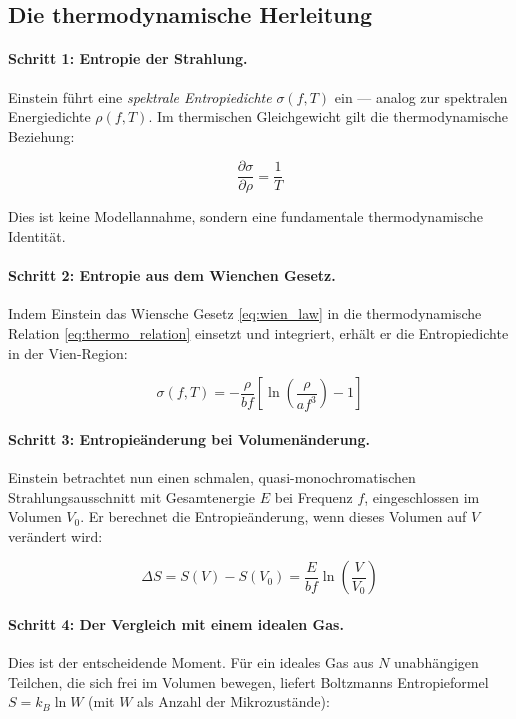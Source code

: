 \subsection{Die thermodynamische Herleitung}

\paragraph{Schritt 1: Entropie der Strahlung.}
Einstein führt eine \emph{spektrale Entropiedichte} $\sigma(f, T)$ ein — analog zur 
spektralen Energiedichte $\rho(f, T)$. Im thermischen Gleichgewicht gilt die 
thermodynamische Beziehung:

\begin{equation}
    \frac{\partial \sigma}{\partial \rho} = \frac{1}{T}
    \label{eq:thermo_relation}
\end{equation}

Dies ist keine Modellannahme, sondern eine fundamentale thermodynamische Identität.

\paragraph{Schritt 2: Entropie aus dem Wienchen Gesetz.}
Indem Einstein das Wiensche Gesetz \eqref{eq:wien_law} in die thermodynamische 
Relation \eqref{eq:thermo_relation} einsetzt und integriert, erhält er die 
Entropiedichte in der Vien-Region:

\begin{equation}
    \sigma(f, T) = -\frac{\rho}{bf} \left[\ln\!\left(\frac{\rho}{af^3}\right) - 1\right]
    \label{eq:entropy_density}
\end{equation}

\paragraph{Schritt 3: Entropieänderung bei Volumenänderung.}
Einstein betrachtet nun einen schmalen, quasi-monochromatischen Strahlungsausschnitt 
mit Gesamtenergie $E$ bei Frequenz $f$, eingeschlossen im Volumen $V_0$. Er berechnet 
die Entropieänderung, wenn dieses Volumen auf $V$ verändert wird:

\begin{equation}
    \Delta S = S(V) - S(V_0) = \frac{E}{bf} \ln\!\left(\frac{V}{V_0}\right)
    \label{eq:entropy_change}
\end{equation}

\paragraph{Schritt 4: Der Vergleich mit einem idealen Gas.}
Dies ist der entscheidende Moment. Für ein ideales Gas aus $N$ unabhängigen Teilchen, 
die sich frei im Volumen bewegen, liefert Boltzmanns Entropieformel $S = k_B \ln W$ 
(mit $W$ als Anzahl der Mikrozustände):

